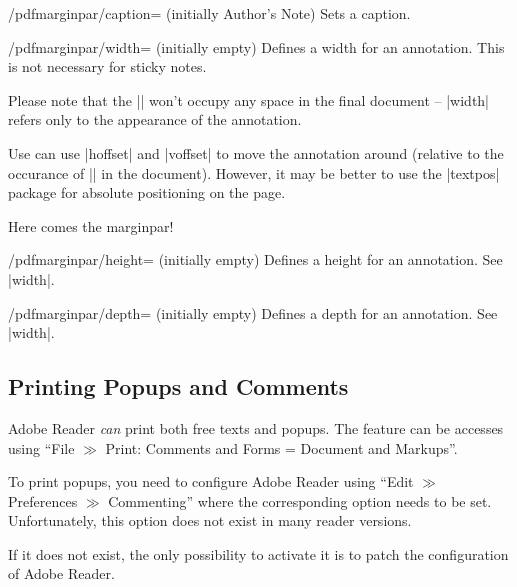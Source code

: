 \documentclass[a4paper]{ltxdoc}
\begin{document}
\begin{key}{/pdfmarginpar/caption= (initially Author's Note)}
	Sets a caption.
\end{key}

\begin{key}{/pdfmarginpar/width= (initially empty)}
	Defines a width for an annotation. This is not necessary for sticky notes.
\begin{codeexample}[width=2cm]
\end{codeexample}
	Please note that the |\pdfmarginpar| won't occupy any space in the final document -- |width| refers only to the appearance of the annotation.

	Use can use |hoffset| and |voffset| to move the annotation around (relative to the occurance of |\pdfmarginpar| in the document). However, it may be better to use the |textpos| package for absolute positioning on the page.
\begin{codeexample}[width=2cm]
Here comes the marginpar!
\end{codeexample}
\end{key}

\begin{key}{/pdfmarginpar/height= (initially empty)}
	Defines a height for an annotation. See |width|.
\end{key}
\begin{key}{/pdfmarginpar/depth= (initially empty)}
	Defines a depth for an annotation. See |width|.
\end{key}


\subsection{Printing Popups and Comments}
Adobe Reader \emph{can} print both free texts and popups. The feature can be accesses using ``File $\gg$ Print: Comments and Forms = Document and Markups''. 

To print popups, you need to configure Adobe Reader using ``Edit $\gg$ Preferences $\gg$ Commenting'' where the corresponding option needs to be set. Unfortunately, this option does not exist in many reader versions.

If it does not exist, the only possibility to activate it is to patch the configuration of Adobe Reader.
\end{document}
